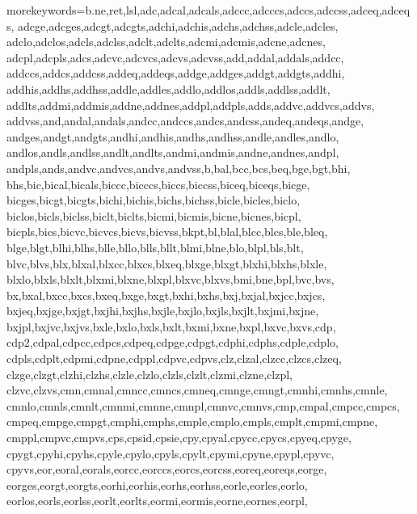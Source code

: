 %
   {morekeywords={b.ne,ret,lsl,adc,adcal,adcals,adccc,adcccs,adccs,adccss,adceq,adceqs,    %
      adcge,adcges,adcgt,adcgts,adchi,adchis,adchs,adchss,adcle,adcles,       %
      adclo,adclos,adcls,adclss,adclt,adclts,adcmi,adcmis,adcne,adcnes,       %
      adcpl,adcpls,adcs,adcvc,adcvcs,adcvs,adcvss,add,addal,addals,addcc,     %
      addccs,addcs,addcss,addeq,addeqs,addge,addges,addgt,addgts,addhi,       %
      addhis,addhs,addhss,addle,addles,addlo,addlos,addls,addlss,addlt,       %
      addlts,addmi,addmis,addne,addnes,addpl,addpls,adds,addvc,addvcs,addvs,  %
      addvss,and,andal,andals,andcc,andccs,andcs,andcss,andeq,andeqs,andge,   %
      andges,andgt,andgts,andhi,andhis,andhs,andhss,andle,andles,andlo,       %
      andlos,andls,andlss,andlt,andlts,andmi,andmis,andne,andnes,andpl,       %
      andpls,ands,andvc,andvcs,andvs,andvss,b,bal,bcc,bcs,beq,bge,bgt,bhi,    %
      bhs,bic,bical,bicals,biccc,bicccs,biccs,biccss,biceq,biceqs,bicge,      %
      bicges,bicgt,bicgts,bichi,bichis,bichs,bichss,bicle,bicles,biclo,       %
      biclos,bicls,biclss,biclt,biclts,bicmi,bicmis,bicne,bicnes,bicpl,       %
      bicpls,bics,bicvc,bicvcs,bicvs,bicvss,bkpt,bl,blal,blcc,blcs,ble,bleq,  %
      blge,blgt,blhi,blhs,blle,bllo,blls,bllt,blmi,blne,blo,blpl,bls,blt,     %
      blvc,blvs,blx,blxal,blxcc,blxcs,blxeq,blxge,blxgt,blxhi,blxhs,blxle,    %
      blxlo,blxls,blxlt,blxmi,blxne,blxpl,blxvc,blxvs,bmi,bne,bpl,bvc,bvs,    %
      bx,bxal,bxcc,bxcs,bxeq,bxge,bxgt,bxhi,bxhs,bxj,bxjal,bxjcc,bxjcs,       %
      bxjeq,bxjge,bxjgt,bxjhi,bxjhs,bxjle,bxjlo,bxjls,bxjlt,bxjmi,bxjne,      %
      bxjpl,bxjvc,bxjvs,bxle,bxlo,bxls,bxlt,bxmi,bxne,bxpl,bxvc,bxvs,cdp,     %
      cdp2,cdpal,cdpcc,cdpcs,cdpeq,cdpge,cdpgt,cdphi,cdphs,cdple,cdplo,       %
      cdpls,cdplt,cdpmi,cdpne,cdppl,cdpvc,cdpvs,clz,clzal,clzcc,clzcs,clzeq,  %
      clzge,clzgt,clzhi,clzhs,clzle,clzlo,clzls,clzlt,clzmi,clzne,clzpl,      %
      clzvc,clzvs,cmn,cmnal,cmncc,cmncs,cmneq,cmnge,cmngt,cmnhi,cmnhs,cmnle,  %
      cmnlo,cmnls,cmnlt,cmnmi,cmnne,cmnpl,cmnvc,cmnvs,cmp,cmpal,cmpcc,cmpcs,  %
      cmpeq,cmpge,cmpgt,cmphi,cmphs,cmple,cmplo,cmpls,cmplt,cmpmi,cmpne,      %
      cmppl,cmpvc,cmpvs,cps,cpsid,cpsie,cpy,cpyal,cpycc,cpycs,cpyeq,cpyge,    %
      cpygt,cpyhi,cpyhs,cpyle,cpylo,cpyls,cpylt,cpymi,cpyne,cpypl,cpyvc,      %
      cpyvs,eor,eoral,eorals,eorcc,eorccs,eorcs,eorcss,eoreq,eoreqs,eorge,    %
      eorges,eorgt,eorgts,eorhi,eorhis,eorhs,eorhss,eorle,eorles,eorlo,       %
      eorlos,eorls,eorlss,eorlt,eorlts,eormi,eormis,eorne,eornes,eorpl,       %
}}
